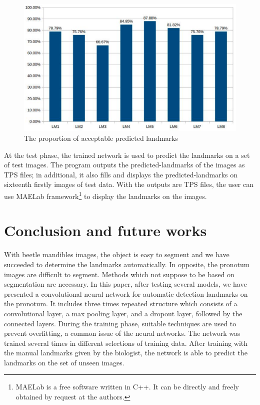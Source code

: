 \documentclass[conference]{IEEEtran}
\begin{document}
\begin{figure}[htbp]
	\centerline{\includegraphics[scale=0.2]{images/chart}}
	\caption{The proportion of acceptable predicted landmarks}
	\label{figchart}
\end{figure}

At the test phase, the trained network is used to predict the landmarks on a set of test images. The program outputs the predicted-landmarks of the images as TPS files; in additional, it also fills and displays the predicted-landmarks on sixteenth firstly images of test data. With the outputs are TPS files, the user can use MAELab \cite{le2017maelab} framework\footnote{MAELab is a free software written in C++. It can be directly
and freely obtained by request at the authors.} to display the landmarks on the images.
\section{Conclusion and future works}
With beetle mandibles images, the object is easy to segment and we have succeeded to determine the landmarks automatically. In opposite, the pronotum images are difficult to segment. Methods which not suppose to be based on segmentation are necessary. In this paper, after testing several models, we have presented a convolutional neural network for automatic detection landmarks on the pronotum. It includes three times repeated structure which consists of a convolutional layer, a max pooling layer, and a dropout layer, followed by the connected layers. During the training phase, suitable techniques are used to prevent overfitting, a common issue of the neural networks. The network was trained several times in different selections of training data. After training with the manual landmarks given by the biologist, the network is able to predict the landmarks on the set of unseen images.
\end{document}
